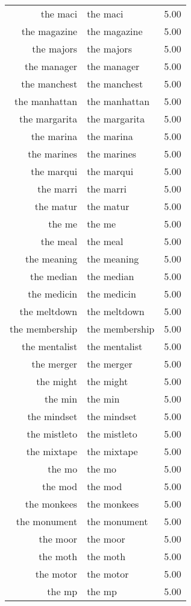 \begin{table}[ht]
\begin{tabular}{rlr}
  the maci & the maci & 5.00 \\ 
  the magazine & the magazine & 5.00 \\ 
  the majors & the majors & 5.00 \\ 
  the manager & the manager & 5.00 \\ 
  the manchest & the manchest & 5.00 \\ 
  the manhattan & the manhattan & 5.00 \\ 
  the margarita & the margarita & 5.00 \\ 
  the marina & the marina & 5.00 \\ 
  the marines & the marines & 5.00 \\ 
  the marqui & the marqui & 5.00 \\ 
  the marri & the marri & 5.00 \\ 
  the matur & the matur & 5.00 \\ 
  the me & the me & 5.00 \\ 
  the meal & the meal & 5.00 \\ 
  the meaning & the meaning & 5.00 \\ 
  the median & the median & 5.00 \\ 
  the medicin & the medicin & 5.00 \\ 
  the meltdown & the meltdown & 5.00 \\ 
  the membership & the membership & 5.00 \\ 
  the mentalist & the mentalist & 5.00 \\ 
  the merger & the merger & 5.00 \\ 
  the might & the might & 5.00 \\ 
  the min & the min & 5.00 \\ 
  the mindset & the mindset & 5.00 \\ 
  the mistleto & the mistleto & 5.00 \\ 
  the mixtape & the mixtape & 5.00 \\ 
  the mo & the mo & 5.00 \\ 
  the mod & the mod & 5.00 \\ 
  the monkees & the monkees & 5.00 \\ 
  the monument & the monument & 5.00 \\ 
  the moor & the moor & 5.00 \\ 
  the moth & the moth & 5.00 \\ 
  the motor & the motor & 5.00 \\ 
  the mp & the mp & 5.00 \\ 

\end{tabular}
\end{table}
